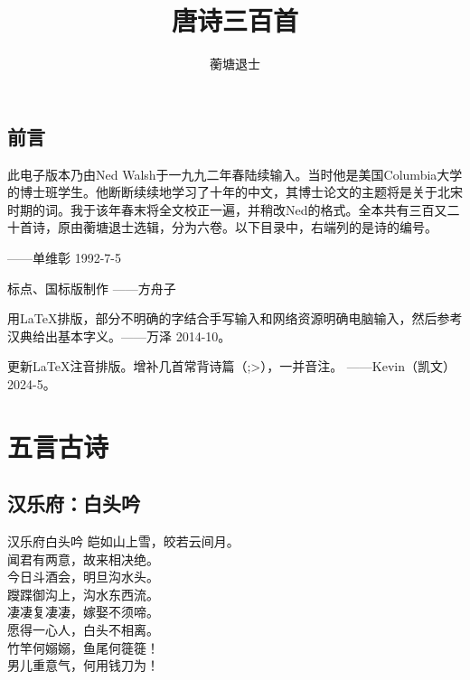 \documentclass[12pt,oneside,a5paper]{book}
\begin{document}
\frontmatter

\title{唐诗三百首}
\author{蘅塘退士}
\maketitle

\begin{common-format}
\chapter*{前言}

此电子版本乃由Ned Walsh于一九九二年春陆续输入。当时他是美国Columbia大学的博士班学生。他断断续续地学习了十年的中文，其博士论文的主题将是关于北宋时期的词。我于该年春末将全文校正一遍，并稍改Ned的格式。全本共有三百又二十首诗，原由蘅塘退士选辑，分为六卷。以下目录中，右端列的是诗的编号。

——单维彰 1992-7-5

标点、国标版制作 ——方舟子

用\LaTeX 排版，部分不明确的字结合手写输入和网络资源明确电脑输入，然后参考汉典给出基本字义。——万泽 2014-10。

更新\LaTeX 注音排版。增补几首常背诗篇（;>），一并音注。 ——Kevin（凯文） 2024-5。


\end{common-format}


\setcounter{tocdepth}{3}
\tableofcontents

\mainmatter

\part{五言古诗}

\chapter{汉乐府：白头吟}
\begin{poemzh}{汉乐府}{白头吟}
皑如山上雪，皎若云间月。\\
闻君有两意，故来相决绝。\\
今日斗酒会，明旦沟水头。\\
躞蹀御沟上，沟水东西流。\\
凄凄复凄凄，嫁娶不须啼。\\
愿得一心人，白头不相离。\\
竹竿何嫋嫋，鱼尾何簁簁！\\
男儿重意气，何用钱刀为！\\
\end{poemzh}
\end{document}
